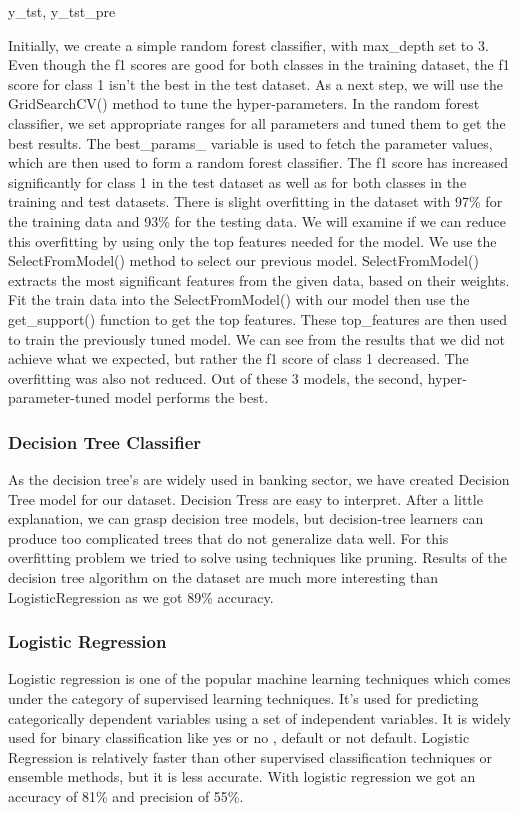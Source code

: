 y_tst, y_tst_pre\documentclass[12pt]{article}
\begin{document}
Initially, we create a simple random forest classifier, with max\_depth set to 3. Even though the f1 scores are good for both classes in the training dataset, the f1 score for class 1 isn't the best in the test dataset. As a next step, we will use the GridSearchCV() method to tune the hyper-parameters. In the random forest classifier, we set appropriate ranges for all parameters and tuned them to get the best results. The best\_params\_ variable is used to fetch the parameter values, which are then used to form a random forest classifier. The f1 score has increased significantly for class 1 in the test dataset as well as for both classes in the training and test datasets. There is slight overfitting in the dataset with 97\% for the training data and 93\% for the testing data. We will examine if we can reduce this overfitting by using only the top features needed for the model. We use the SelectFromModel() method to select our previous model. SelectFromModel() extracts the most significant features from the given data, based on their weights. Fit the train data into the SelectFromModel() with our model then use the get\_support() function to get the top features. These top\_features are then used to train the previously tuned model. We can see from the results that we did not achieve what we expected, but rather the f1 score of class 1 decreased. The overfitting was also not reduced. Out of these 3 models, the second, hyper-parameter-tuned model performs the best.

\subsubsection{Decision Tree Classifier}
As the decision tree's are widely used in banking sector, we have created Decision Tree model for our dataset. Decision Tress are easy to interpret. After a little explanation, we can grasp decision tree models, but decision-tree learners can produce too complicated trees that do not generalize data well. For this overfitting problem we tried to solve using techniques like pruning.
Results of the decision tree algorithm on the dataset are much more interesting than LogisticRegression as we got 89\% accuracy.

\subsubsection{Logistic Regression}
Logistic regression is one of the popular machine learning techniques which comes under the category of supervised learning techniques. It’s used for predicting categorically dependent variables using a set of independent variables. It is widely used for binary classification like yes or no , default or not default. Logistic Regression is relatively faster than other supervised classification techniques or ensemble methods, but it is less accurate. With logistic regression we got an accuracy of 81\% and precision of 55\%.
\end{document}
